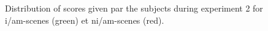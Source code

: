 \documentclass[twoside,twocolumn]{article}
\begin{document}
\begin{figure}[h]
        \caption{Distribution of scores given par the subjects during experiment 2 for i/am-scenes (green) et ni/am-scenes (red).}\label{fig:xp4_note_1}
\end{figure}
\end{document}
